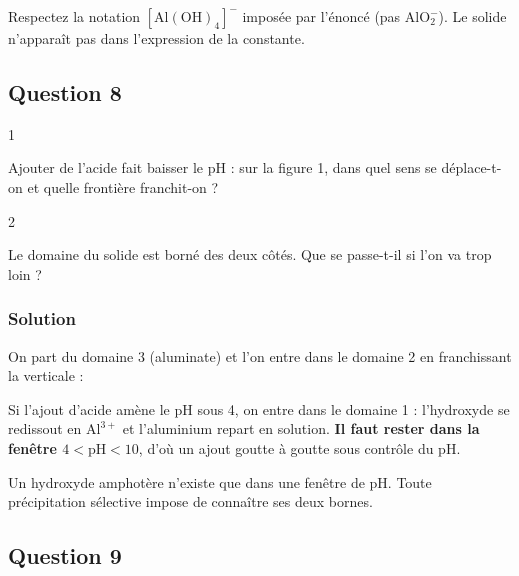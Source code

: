 \documentclass[11pt,a4paper]{article}
\newcommand{\equationajustee}[1]{%
  \sbox{\boiteequation}{$\displaystyle #1$}%
  \ifdim\wd\boiteequation>\linewidth
    \[\resizebox{\linewidth}{!}{\usebox{\boiteequation}}\]%
  \else
    \[#1\]%
  \fi}
\begin{document}
\begin{piege}

Respectez la notation \([\mathrm{Al(OH)_4}]^-\) imposée par l'énoncé (pas \(\mathrm{AlO_2^-}\)). Le solide n'apparaît pas dans l'expression de la constante.

\end{piege}

\hypertarget{question-8}{%
\subsection{Question 8}\label{question-8}}

\begin{indication}{1}

Ajouter de l'acide fait baisser le pH : sur la figure 1, dans quel sens se déplace-t-on et quelle frontière franchit-on ?

\end{indication}

\begin{indication}{2}

Le domaine du solide est borné des deux côtés. Que se passe-t-il si l'on va trop loin ?

\end{indication}

\hypertarget{solution-7}{%
\subsubsection{Solution}\label{solution-7}}

On part du domaine 3 (aluminate) et l'on entre dans le domaine 2 en franchissant la verticale :

\equationajustee{\boxed{{\mathrm{pH}}_{\text{\text{précipitation}}}\approx10}}

Si l'ajout d'acide amène le pH sous 4, on entre dans le domaine 1 : l'hydroxyde se redissout en \(\mathrm{Al^{3+}}\) et l'aluminium repart en solution. \textbf{Il faut rester dans la fenêtre \(4<\mathrm{pH}<10\)}, d'où un ajout goutte à goutte sous contrôle du pH.

\begin{methode}

Un hydroxyde amphotère n'existe que dans une fenêtre de pH. Toute précipitation sélective impose de connaître ses deux bornes.

\end{methode}

\hypertarget{question-9}{%
\subsection{Question 9}\label{question-9}}
\end{document}
